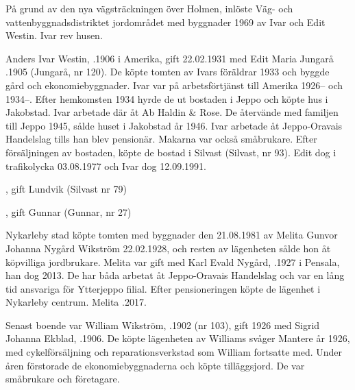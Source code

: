 %



%
På grund av den nya vägsträckningen över Holmen, inlöste Väg- och vattenbyggnadsdistriktet jordområdet med byggnader 1969 av Ivar och Edit Westin. Ivar rev husen.

Anders Ivar Westin, .1906 i Amerika, gift 22.02.1931 med Edit Maria Jungarå .1905 (Jungarå, nr 120). De köpte tomten av Ivars föräldrar 1933 och byggde gård och ekonomiebyggnader. Ivar var på arbetsförtjänst till Amerika 1926-- och 1934--. Efter hemkomsten 1934 hyrde de ut bostaden i Jeppo och köpte hus i Jakobstad. Ivar arbetade där åt Ab Haldin \& Rose. De återvände  med familjen till Jeppo 1945, sålde huset i Jakobstad år 1946. Ivar arbetade åt Jeppo-Oravais Handelslag tills han blev pensionär. Makarna var också småbrukare. Efter försäljningen av bostaden, köpte de bostad i Silvast (Silvast, nr 93). Edit dog i trafikolycka 03.08.1977 och Ivar dog 12.09.1991.
\begin{jhchildren}
  \item {}, gift Lundvik (Silvast nr 79)
  \item {}, gift Gunnar (Gunnar, nr 27)
\end{jhchildren}



%


%
Nykarleby stad köpte tomten med byggnader den 21.08.1981 av Melita Gunvor Johanna Nygård \textborn Wikström 22.02.1928, och resten av lägenheten sålde hon åt köpvilliga jordbrukare. Melita var gift med Karl Evald Nygård, .1927 i Pensala, han dog 2013. De har båda arbetat åt Jeppo-Oravais Handelslag och var en lång tid ansvariga för Ytterjeppo filial. Efter pensioneringen köpte de lägenhet i Nykarleby centrum. Melita .2017.


%
Senast boende var William Wikström, .1902 (nr 103), gift 1926 med Sigrid Johanna Ekblad, .1906. De köpte lägenheten av Williams svåger Mantere år 1926, med cykelförsäljning och reparationsverkstad som William fortsatte med. Under åren förstorade de ekonomiebyggnaderna och köpte tilläggsjord. De var småbrukare och företagare.

